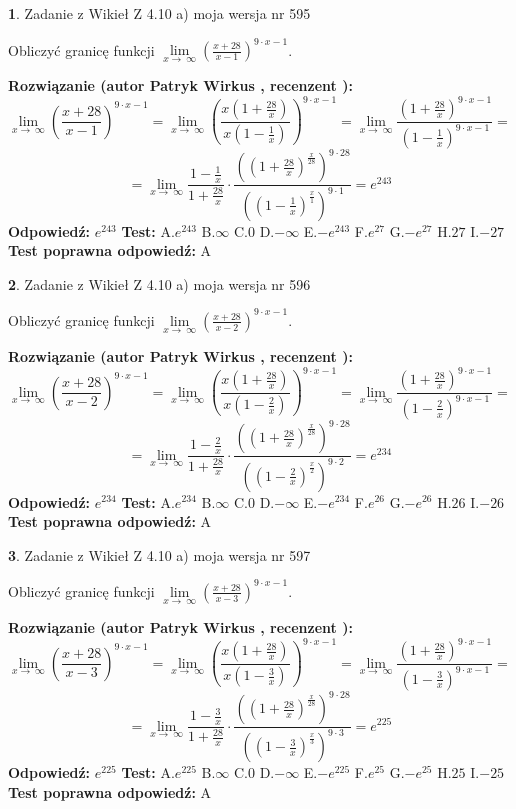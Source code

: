 \documentclass[12pt, a4paper]{article}
\theoremstyle{definition} %
\newtheorem{zad}{}
\newcommand{\zadStart}[1]{\begin{zad}#1\newline}
\newcommand{\zadStop}{\end{zad}}
\newcommand{\rozwStart}[2]{\noindent \textbf{Rozwiązanie (autor #1 , recenzent #2): }\newline}
\newcommand{\rozwStop}{\newline}
\newcommand{\odpStart}{\noindent \textbf{Odpowiedź:}\newline}
\newcommand{\odpStop}{\newline}
\newcommand{\testStart}{\noindent \textbf{Test:}\newline}
\newcommand{\testStop}{\newline}
\newcommand{\kluczStart}{\noindent \textbf{Test poprawna odpowiedź:}\newline}
\newcommand{\kluczStop}{\newline}
\begin{document}
\zadStart{Zadanie z Wikieł Z 4.10 a) moja wersja nr 595}

Obliczyć granicę funkcji  $\lim\limits_{x\to\ \infty}(\frac{x+28}{x-1})^{9\cdot x-1}$.
\zadStop
\rozwStart{Patryk Wirkus}{}
$$\lim\limits_{x\to\ \infty}(\frac{x+28}{x-1})^{9\cdot x-1} = \lim\limits_{x\to\ \infty}(\frac{x(1+\frac{28}{x})}{x(1-\frac{1}{x})})^{9\cdot x-1}=\lim\limits_{x\to\ \infty}\frac{(1+\frac{28}{x})^{9\cdot x-1}}{(1-\frac{1}{x})^{9\cdot x-1}}=$$
$$=\lim\limits_{x\to\ \infty}\frac{1-\frac{1}{x}}{1+\frac{28}{x}}\cdot\frac{((1+\frac{28}{x})^{\frac{x}{28}})^{9\cdot28}}{((1-\frac{1}{x})^{\frac{x}{1}})^{9\cdot1}}=e^{243}$$
\rozwStop
\odpStart
$e^{243}$
\odpStop
\testStart
A.$e^{243}$ B.$\infty$ C.$0$ D.$-\infty$ E.$-e^{243}$
F.$e^{27}$ G.$-e^{27}$
H.$27$
I.$-27$
\testStop
\kluczStart
A
\kluczStop



\zadStart{Zadanie z Wikieł Z 4.10 a) moja wersja nr 596}

Obliczyć granicę funkcji  $\lim\limits_{x\to\ \infty}(\frac{x+28}{x-2})^{9\cdot x-1}$.
\zadStop
\rozwStart{Patryk Wirkus}{}
$$\lim\limits_{x\to\ \infty}(\frac{x+28}{x-2})^{9\cdot x-1} = \lim\limits_{x\to\ \infty}(\frac{x(1+\frac{28}{x})}{x(1-\frac{2}{x})})^{9\cdot x-1}=\lim\limits_{x\to\ \infty}\frac{(1+\frac{28}{x})^{9\cdot x-1}}{(1-\frac{2}{x})^{9\cdot x-1}}=$$
$$=\lim\limits_{x\to\ \infty}\frac{1-\frac{2}{x}}{1+\frac{28}{x}}\cdot\frac{((1+\frac{28}{x})^{\frac{x}{28}})^{9\cdot28}}{((1-\frac{2}{x})^{\frac{x}{2}})^{9\cdot2}}=e^{234}$$
\rozwStop
\odpStart
$e^{234}$
\odpStop
\testStart
A.$e^{234}$ B.$\infty$ C.$0$ D.$-\infty$ E.$-e^{234}$
F.$e^{26}$ G.$-e^{26}$
H.$26$
I.$-26$
\testStop
\kluczStart
A
\kluczStop



\zadStart{Zadanie z Wikieł Z 4.10 a) moja wersja nr 597}

Obliczyć granicę funkcji  $\lim\limits_{x\to\ \infty}(\frac{x+28}{x-3})^{9\cdot x-1}$.
\zadStop
\rozwStart{Patryk Wirkus}{}
$$\lim\limits_{x\to\ \infty}(\frac{x+28}{x-3})^{9\cdot x-1} = \lim\limits_{x\to\ \infty}(\frac{x(1+\frac{28}{x})}{x(1-\frac{3}{x})})^{9\cdot x-1}=\lim\limits_{x\to\ \infty}\frac{(1+\frac{28}{x})^{9\cdot x-1}}{(1-\frac{3}{x})^{9\cdot x-1}}=$$
$$=\lim\limits_{x\to\ \infty}\frac{1-\frac{3}{x}}{1+\frac{28}{x}}\cdot\frac{((1+\frac{28}{x})^{\frac{x}{28}})^{9\cdot28}}{((1-\frac{3}{x})^{\frac{x}{3}})^{9\cdot3}}=e^{225}$$
\rozwStop
\odpStart
$e^{225}$
\odpStop
\testStart
A.$e^{225}$ B.$\infty$ C.$0$ D.$-\infty$ E.$-e^{225}$
F.$e^{25}$ G.$-e^{25}$
H.$25$
I.$-25$
\testStop
\kluczStart
A
\kluczStop
\end{document}
